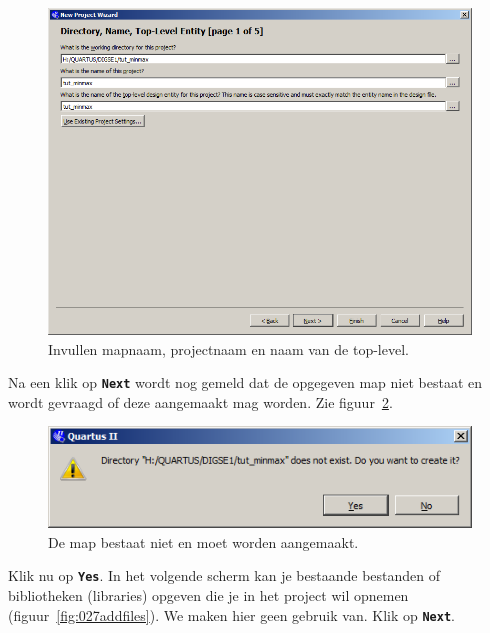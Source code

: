 \documentclass[a4paper,12pt,fleqn,twoside]{book}
\def\tutpicscale{0.455}
\newcommand{\menu}[1]{\texttt{\textbf{#1}}}
\newcommand{\knop}[1]{\texttt{\textbf{#1}}}
\begin{document}
\begin{figure}[H]
\centering
\includegraphics[scale=\tutpicscale]{025enterdirandname.png}
\caption{Invullen mapnaam, projectnaam en naam van de top-level.}
\label{fig:025enterdirandname}
\end{figure}

Na een klik op \menu{Next} wordt nog gemeld dat de opgegeven map niet bestaat
en wordt gevraagd of deze aangemaakt mag worden. Zie
figuur~\ref{fig:026dirdoesnotexist}. 

\begin{figure}[H]
\centering
\includegraphics[scale=\tutpicscale]{026dirdoesnotexist.png}
\caption{De map bestaat niet en moet worden aangemaakt.}
\label{fig:026dirdoesnotexist}
\end{figure}

Klik nu op \knop{Yes}. In het volgende scherm kan je bestaande bestanden of
bibliotheken (libraries) opgeven die je in het project wil opnemen
(figuur~\ref{fig:027addfiles}). We maken hier geen gebruik van. Klik op
\knop{Next}.
\end{document}
